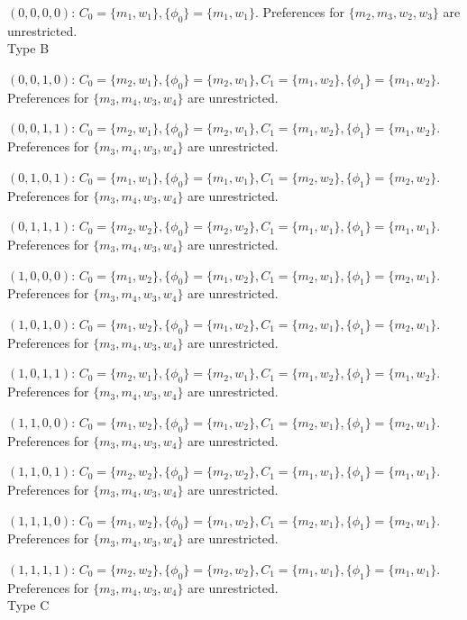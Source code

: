 \documentclass[WP]{AEA}
\begin{document}
$(0,0,0,0)$: $C_0 =\{m_1,w_1\}, \{\phi_0\}=\{m_1,w_1\}$.  Preferences for $\{m_2,m_3,w_2,w_3\}$ are unrestricted.
\\

Type B

$(0,0,1,0)$: $C_0 =\{m_2,w_1\}, \{\phi_0\}=\{m_2,w_1\}, C_1 =\{m_1,w_2\}, \{\phi_1\}=\{m_1,w_2\}$.  Preferences for $\{m_3,m_4,w_3,w_4\}$ are unrestricted.


$(0,0,1,1)$: $C_0 =\{m_2,w_1\}, \{\phi_0\}=\{m_2,w_1\}, C_1 =\{m_1,w_2\}, \{\phi_1\}=\{m_1,w_2\}$.  Preferences for $\{m_3,m_4,w_3,w_4\}$ are unrestricted.


$(0,1,0,1)$: $C_0 =\{m_1,w_1\}, \{\phi_0\}=\{m_1,w_1\}, C_1 =\{m_2,w_2\}, \{\phi_1\}=\{m_2,w_2\}$.  Preferences for $\{m_3,m_4,w_3,w_4\}$ are unrestricted.


$(0,1,1,1)$: $C_0 =\{m_2,w_2\}, \{\phi_0\}=\{m_2,w_2\}, C_1 =\{m_1,w_1\}, \{\phi_1\}=\{m_1,w_1\}$.  Preferences for $\{m_3,m_4,w_3,w_4\}$ are unrestricted.


$(1,0,0,0)$: $C_0 =\{m_1,w_2\}, \{\phi_0\}=\{m_1,w_2\}, C_1 =\{m_2,w_1\}, \{\phi_1\}=\{m_2,w_1\}$.  Preferences for $\{m_3,m_4,w_3,w_4\}$ are unrestricted.


$(1,0,1,0)$: $C_0 =\{m_1,w_2\}, \{\phi_0\}=\{m_1,w_2\}, C_1 =\{m_2,w_1\}, \{\phi_1\}=\{m_2,w_1\}$.  Preferences for $\{m_3,m_4,w_3,w_4\}$ are unrestricted.


$(1,0,1,1)$: $C_0 =\{m_2,w_1\}, \{\phi_0\}=\{m_2,w_1\}, C_1 =\{m_1,w_2\}, \{\phi_1\}=\{m_1,w_2\}$.  Preferences for $\{m_3,m_4,w_3,w_4\}$ are unrestricted.



$(1,1,0,0)$:  $C_0 =\{m_1,w_2\}, \{\phi_0\}=\{m_1,w_2\}, C_1 =\{m_2,w_1\}, \{\phi_1\}=\{m_2,w_1\}$.  Preferences for $\{m_3,m_4,w_3,w_4\}$ are unrestricted.


$(1,1,0,1)$:  $C_0 =\{m_2,w_2\}, \{\phi_0\}=\{m_2,w_2\}, C_1 =\{m_1,w_1\}, \{\phi_1\}=\{m_1,w_1\}$.  Preferences for $\{m_3,m_4,w_3,w_4\}$ are unrestricted.



$(1,1,1,0)$:  $C_0 =\{m_1,w_2\}, \{\phi_0\}=\{m_1,w_2\}, C_1 =\{m_2,w_1\}, \{\phi_1\}=\{m_2,w_1\}$.  Preferences for $\{m_3,m_4,w_3,w_4\}$ are unrestricted.



$(1,1,1,1)$:  $C_0 =\{m_2,w_2\}, \{\phi_0\}=\{m_2,w_2\}, C_1 =\{m_1,w_1\}, \{\phi_1\}=\{m_1,w_1\}$.  Preferences for $\{m_3,m_4,w_3,w_4\}$ are unrestricted.
\\

Type C
\end{document}
